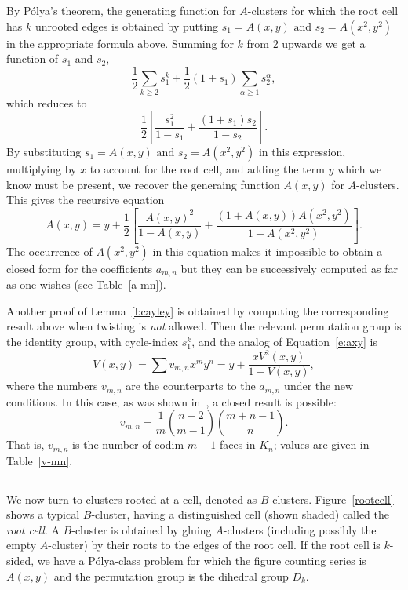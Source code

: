 \documentclass[10pt]{amsart}
\begin{document}
\vspace{-.2in}
\noindent By P\'{o}lya's theorem, the generating function for $A$-clusters for which the root cell has $k$ unrooted edges is obtained by putting $s_1 = A(x, y) \mbox{ and } s_2 = A(x^2, y^2)$ in the appropriate formula above. Summing for $k$ from 2 upwards we get a function of $s_1$ and $s_2$,
$$\frac{1}{2}\sum_{k\geq 2} s_1^k + \frac{1}{2}(1 + s_1)\sum_{\alpha \geq 1} s_2^\alpha,$$
which reduces to
$$\frac{1}{2} \left[ \frac{s_1^2}{1 - s_1} + \frac{(1+s_1)s_2}{1 - s_2} \right].$$
By substituting $s_1 = A(x, y) \mbox{ and } s_2 = A(x^2, y^2)$ in this expression, multiplying by $x$ to account for the root cell, and adding the term $y$ which we know must be present, we recover the generaing function $A(x,y)$ for $A$-clusters. This gives the recursive equation
\begin{equation}
A(x,y) = y + \frac{1}{2} \left[ \frac{A(x,y)^2}{1-A(x,y)} + 
\frac{(1+A(x,y))A(x^2,y^2)}{1-A(x^2,y^2)} \right].
\label{e:axy}
\end{equation}
The occurrence of $A(x^2, y^2)$ in this equation makes it impossible to obtain a closed form for the coefficients $a_{m,n}$ but they can be successively computed as far as one wishes (see Table~\ref{a-mn}).

\begin{rem}
Another proof of Lemma~\ref{l:cayley} is obtained by computing the corresponding result above when twisting is {\em not} allowed.  Then the relevant permutation group is the identity group, with cycle-index $s_1^k$, and the analog of Equation~\ref{e:axy} is
$$V(x,y) = \sum v_{m,n} x^m y^n  =  y + \frac{xV^2(x,y)}{1 - V(x,y)},$$
where the numbers $v_{m,n}$ are the counterparts to the $a_{m,n}$ under the new conditions. In this case, as was shown in~\cite{r1}, a closed result is possible:
$$v_{m,n}  = \frac{1}{m} \binom{n-2}{m-1} \binom{m+n-1}{n}.$$
That is, $v_{m,n}$ is the number of codim $m-1$ faces in $K_n$; values are given in Table~\ref{v-mn}.
\end{rem}



\subsection{}
We now turn to clusters rooted at a cell, denoted as $B$-clusters. Figure~\ref{rootcell} shows a typical $B$-cluster, having a distinguished cell (shown shaded) called the {\em root cell}.  A $B$-cluster is obtained by gluing $A$-clusters (including possibly the empty $A$-cluster) by their roots to the edges of the root cell. If the root cell is $k$-sided, we have a P\'{o}lya-class problem for which the figure counting series is $A(x, y)$ and the permutation
group is the dihedral group $D_k$.
\end{document}

